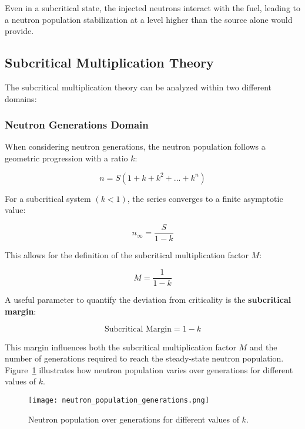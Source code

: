 Even in a subcritical state, the injected neutrons interact with the fuel, leading to a neutron population stabilization at a level higher than the source alone would provide.

\subsection{Subcritical Multiplication Theory}

The subcritical multiplication theory can be analyzed within two different domains:

\subsubsection{Neutron Generations Domain}

When considering neutron generations, the neutron population follows a geometric progression with a ratio $ k $:

\begin{equation}
n = S (1 + k + k^2 + ... + k^n)
\end{equation}

For a subcritical system $( k < 1 )$, the series converges to a finite asymptotic value:

\begin{equation}
n_{\infty} = \frac{S}{1 - k}
\end{equation}

This allows for the definition of the subcritical multiplication factor $ M $:

\begin{equation}
M = \frac{1}{1 - k}
\end{equation}

A useful parameter to quantify the deviation from criticality is the \textbf{subcritical margin}:

\begin{equation}
\text{Subcritical Margin} = 1 - k
\end{equation}

This margin influences both the subcritical multiplication factor $M$ and the number of generations required to reach the steady-state neutron population. Figure~\ref{fig:n_vs_gen} illustrates how neutron population varies over generations for different values of \( k \).

\begin{figure}[H]
    \centering
    \texttt{[image: neutron\_population\_generations.png]} %
    \caption{Neutron population over generations for different values of $ k $.}
    \label{fig:n_vs_gen}
\end{figure}

